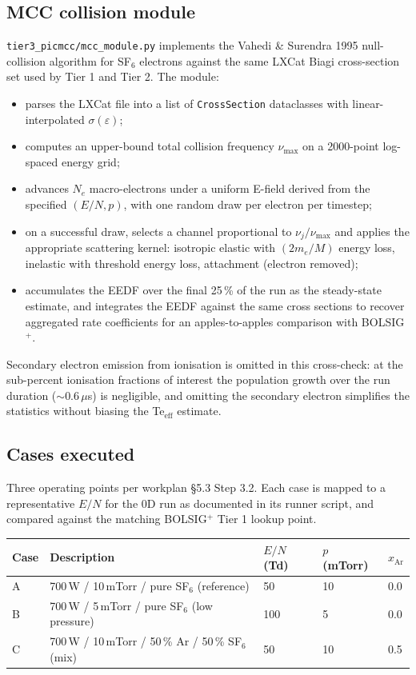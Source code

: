 \documentclass[11pt,a4paper]{article}
\begin{document}
\subsection{MCC collision module}
\texttt{tier3\_picmcc/mcc\_module.py} implements the Vahedi \&
Surendra 1995 null-collision algorithm for SF$_6$ electrons
against the same LXCat Biagi cross-section set used by Tier 1
and Tier 2. The module:
\begin{itemize}
  \item parses the LXCat file into a list of
    \texttt{CrossSection} dataclasses with linear-interpolated
    $\sigma(\varepsilon)$;
  \item computes an upper-bound total collision frequency
    $\nu_{\mathrm{max}}$ on a 2000-point log-spaced energy grid;
  \item advances $N_e$ macro-electrons under a uniform E-field
    derived from the specified $(E/N, p)$, with one random
    draw per electron per timestep;
  \item on a successful draw, selects a channel proportional
    to $\nu_j / \nu_{\mathrm{max}}$ and applies the appropriate
    scattering kernel: isotropic elastic with $(2m_e/M)$
    energy loss, inelastic with threshold energy loss,
    attachment (electron removed);
  \item accumulates the EEDF over the final 25\,\% of the run
    as the steady-state estimate, and integrates the EEDF
    against the same cross sections to recover aggregated
    rate coefficients for an apples-to-apples comparison with
    BOLSIG$^+$.
\end{itemize}

Secondary electron emission from ionisation is omitted in this
cross-check: at the sub-percent ionisation fractions of
interest the population growth over the run duration
($\sim 0.6\,\mu$s) is negligible, and omitting the secondary
electron simplifies the statistics without biasing the
Te$_{\mathrm{eff}}$ estimate.

\subsection{Cases executed}
Three operating points per workplan §5.3 Step 3.2. Each case is
mapped to a representative $E/N$ for the 0D run as documented
in its runner script, and compared against the matching
BOLSIG$^+$ Tier 1 lookup point.

\begin{center}
\begin{tabular}{lllll}
\toprule
Case & Description & $E/N$ (Td) & $p$ (mTorr) & $x_{\mathrm{Ar}}$ \\
\midrule
A & 700\,W / 10\,mTorr / pure SF$_6$ (reference)          & 50  & 10 & 0.0 \\
B & 700\,W / 5\,mTorr / pure SF$_6$ (low pressure)        & 100 &  5 & 0.0 \\
C & 700\,W / 10\,mTorr / 50\,\% Ar / 50\,\% SF$_6$ (mix)  & 50  & 10 & 0.5 \\
\bottomrule
\end{tabular}
\end{center}
\end{document}
